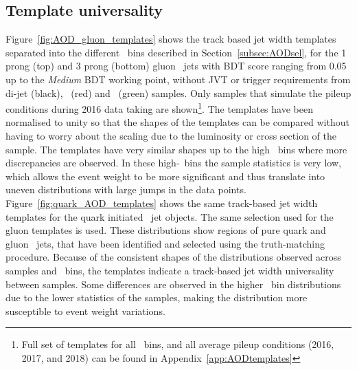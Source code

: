 	\subsection{Template universality}
	 Figure~\ref{fig:AOD_gluon_templates} shows the track based jet width templates separated into the different \pt\ bins described in Section~\ref{subsec:AODsel}, for the 1 prong (top) and 3 prong (bottom) gluon \ftau\ jets with \ac{BDT} score ranging from 0.05 up to the \textit{Medium} \ac{BDT} working point, without \ac{JVT} or trigger requirements from di-jet (black), \Wjets\ (red) and \Zjets\ (green) samples. Only samples that simulate the pileup conditions during 2016 data taking are shown\footnote{Full set of templates for all \pt\ bins, and all average pileup conditions (2016, 2017, and 2018) can be found in Appendix~\ref{app:AODtemplates}}. 
	 The templates have been normalised to unity so that the shapes of the templates can be compared without having to worry about the scaling due to the luminosity or cross section of the sample. 
	 The templates have very similar shapes up to the high \pt\ bins where more discrepancies are observed. In these high-\pt\ bins the sample statistics is very low, which allows the event weight to be more significant and thus translate into uneven distributions with large jumps in the data points.
	Figure~\ref{fig:quark_AOD_templates} %
	shows the same track-based jet width templates for the quark initiated \ftau\ jet objects.
	The same selection used for the gluon templates is used.%
	These distributions show regions of pure quark and gluon \ftau\ jets, that have been identified and selected using the truth-matching procedure.
	 Because of the consistent shapes of the distributions observed across samples and \pt\ bins, the templates indicate a track-based jet width universality between samples. Some differences are observed in the higher \pt\ bin distributions due to the lower statistics of the samples, making the distribution more susceptible to event weight variations. 
